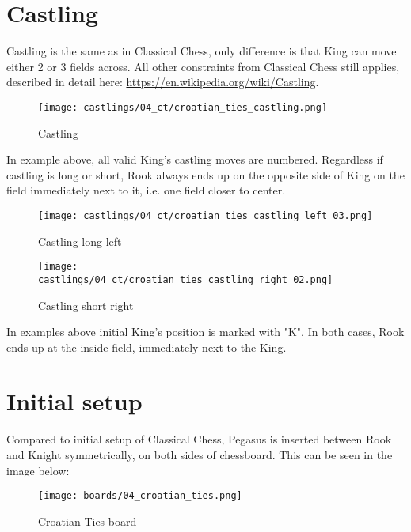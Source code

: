 \clearpage %

\section*{Castling}
\label{sec:Croatian Ties/Castling}

Castling is the same as in Classical Chess, only difference is that King can move either 2 or 3
fields across. All other constraints from Classical Chess still applies, described in detail here:
\href{https://en.wikipedia.org/wiki/Castling}{https://en.wikipedia.org/wiki/Castling}.

\noindent
\begin{figure}[!h]
\texttt{[image: castlings/04\_ct/croatian\_ties\_castling.png]}
\caption{Castling}
\label{fig:croatian_ties_castling}
\end{figure}

In example above, all valid King's castling moves are numbered. Regardless if castling is long or short,
Rook always ends up on the opposite side of King on the field immediately next to it, i.e. one field closer
to center.

\noindent
\begin{figure}[!h]
\texttt{[image: castlings/04\_ct/croatian\_ties\_castling\_left\_03.png]}
\caption{Castling long left}
\label{fig:croatian_ties_castling_left_03}
\end{figure}

\noindent
\begin{figure}[!h]
\texttt{[image: castlings/04\_ct/croatian\_ties\_castling\_right\_02.png]}
\caption{Castling short right}
\label{fig:croatian_ties_castling_right_02}
\end{figure}

In examples above initial King's position is marked with "K". In both cases, Rook ends up at the
inside field, immediately next to the King.

\clearpage %

\section*{Initial setup}
\label{sec:Croatian Ties/Initial setup}

Compared to initial setup of Classical Chess, Pegasus is inserted between Rook and Knight
symmetrically, on both sides of chessboard. This can be seen in the image below:

\noindent
\begin{figure}[h]
\texttt{[image: boards/04\_croatian\_ties.png]}
\caption{Croatian Ties board}
\label{fig:04_croatian_ties}
\end{figure}

\clearpage %
